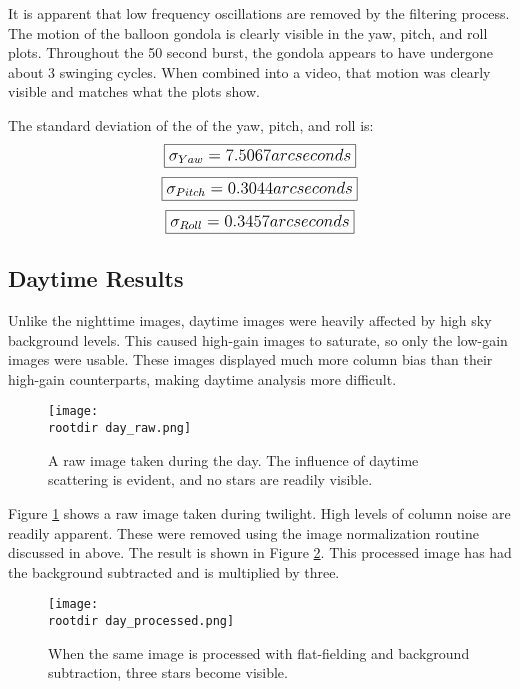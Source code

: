 \documentclass[twocolumn,letterpaper]{IEEEAerospace2012}
\newcommand{\rootdir}{./Figures/}
\begin{document}
It is apparent that low frequency oscillations are removed by the filtering process. The motion of the balloon gondola is clearly visible in the yaw, pitch, and roll plots. Throughout the 50 second burst, the gondola appears to have undergone about 3 swinging cycles. When combined into a video, that motion was clearly visible and matches what the plots show. 

The standard deviation of the of the yaw, pitch, and roll is:
\begin{displaymath}\large
    \boxed{\sigma_{Yaw} = 7.5067 arcseconds}
\end{displaymath}
\begin{displaymath}\large
    \boxed{\sigma_{Pitch} = 0.3044 arcseconds}
\end{displaymath}
\begin{displaymath}\large
    \boxed{\sigma_{Roll} = 0.3457 arcseconds}
\end{displaymath}



\subsection{Daytime Results}

Unlike the nighttime images, daytime images were heavily affected by high sky background levels. This caused high-gain images to saturate, so only the low-gain images were usable. These images displayed much more column bias than their high-gain counterparts, making daytime analysis more difficult. 
\begin{figure}[H]
    \centering
    \texttt{[image: \\rootdir day\_raw.png]}
    \caption{A raw image taken during the day. The influence of daytime scattering is evident, and no stars are readily visible.}
    \label{fig:day_raw}
\end{figure}

Figure \ref{fig:day_raw} shows a raw image taken during twilight. High levels of column noise are readily apparent. These were removed using the image normalization routine discussed in above. The result is shown in Figure \ref{fig:day_processed}. This processed image has had the background subtracted and is multiplied by three.
\begin{figure}[H]
    \centering
    \texttt{[image: \\rootdir day\_processed.png]}
    \caption{When the same image is processed with flat-fielding and background subtraction, three stars become visible.}
    \label{fig:day_processed}
\end{figure}
\end{document}
